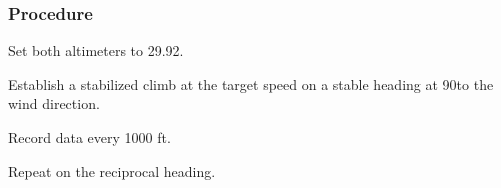 % 
% 
%
 \subsubsection*{Procedure}
 \begin{compactenum}
   \item Set both altimeters to 29.92.
   \item Establish a stabilized climb at the target speed on a stable heading at 90\textdegree to the wind direction.
   \item Record data every 1000 ft.
   \item Repeat on the reciprocal heading.
   \end{compactenum}